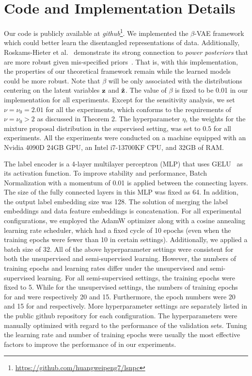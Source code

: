 {\section{Code and Implementation Details} \label{sec:impl}
Our code is publicly available at \emph{github}\footnote{
\url{https://github.com/huangweipeng7/lsnpc}
}. 
We implemented the $\beta$-VAE framework which could better learn the disentangled representations of data.
Additionally, Roskams-Hieter et al.~\cite{roskams2023leveraging} demonstrate its strong connection to \emph{power posteriors} that are more robust given mis-specified priors~\cite{li2023improved,friel2014improving}.
That is, with this implementation, the properties of our theoretical framework remain while the learned models could be more robust.
Note that $\beta$ will be only associated with the distributions centering on the latent variables $\mathbf{z}$ and $\hat{\mathbf{z}}$.
The value of $\beta$ is fixed to be 0.01 in our implementation for all experiments.
Except for the sensitivity analysis, we set $\nu = \nu_0 = 2.01$ for all the experiments, which conforms to the requirements of $\nu = \nu_0 > 2$ as discussed in Theorem 2.
The hyperparameter $\eta$, the weights for the mixture proposal distribution in the supervised setting, was set to $0.5$ for all experiments.
All the experiments were conducted on a machine equipped with an Nvidia 4090D 24GB GPU, an Intel i7-13700KF CPU, and 32GB of RAM.

The label encoder is a 4-layer multilayer perceptron (MLP) that uses GELU~\cite{hendrycks2016gaussian} as its activation function. 
To improve stability and performance, Batch Normalization with a momentum of 0.01 is applied between the connecting layers.
The size of the fully connected layers in this MLP was fixed as 64.
In addition, the output label embedding size was 128.
The solution of merging the label embeddings and data feature embeddings is concatenation.
For all experimental configurations, we employed the AdamW optimizer along with a cosine annealing learning rate scheduler, which had a fixed cycle of 10 epochs (even when the training epochs were fewer than 10 in certain settings).
Additionally, we applied a batch size of 32.
All of the above hyperparameter settings were consistent for both the unsupervised and semi-supervised learning.
However, the numbers of training epochs and learning rates differ under the unsupervised and semi-supervised learning.
For all semi-supervised settings, the training epochs were fixed to 5.
While for the unsupervised settings, the numbers of training epochs for \vocseven{} and \voctwelve{} were respectively 20 and 15.
Furthermore, the epoch numbers were 20 and 15 for \tomato{} and \coco{} respectively.
More hyperparameter settings are separately listed in the public github repository for each configuration. 
The hyperparameters were manually optimized with regard to the performance of the validation sets.
Tuning the learning rate and number of training epochs were usually the most effective factors to improve the performance of \method{} in our experiments.

}

